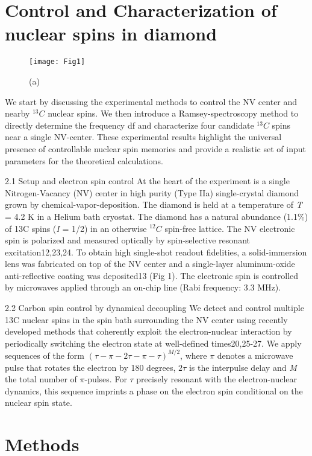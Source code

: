 \section{Control and Characterization of nuclear spins in diamond}
\begin{figure*}
	\centering
	\texttt{[image: Fig1]}
	\caption{\label{fig:cdl-fig1} \textbf{} (a) }
\end{figure*}

We start by discussing the experimental methods to control the NV center and nearby $^{13}C$  nuclear spins. We then introduce a Ramsey-spectroscopy method to directly determine the frequency df and characterize four candidate $^{13}C$  spins near a single NV-center. These experimental results highlight the universal presence of controllable nuclear spin memories and provide a realistic set of input parameters for the theoretical calculations.

2.1 Setup and electron spin control
At the heart of the experiment is a single Nitrogen-Vacancy (NV) center in high purity (Type IIa) single-crystal diamond grown by chemical-vapor-deposition. The diamond is held at a temperature of \textit{T} = 4.2 K in a Helium bath cryostat. The diamond has a natural abundance (1.1\%) of 13C spins (\textit{I} = 1/2) in an otherwise $^{12}C$ spin-free lattice. The NV electronic spin is polarized and measured optically by spin-selective resonant excitation12,23,24. To obtain high single-shot readout fidelities, a solid-immersion lens was fabricated on top of the NV center and a single-layer aluminum-oxide anti-reflective coating was deposited13 (Fig 1). The electronic spin is controlled by microwaves applied through an on-chip line (Rabi frequency: 3.3 MHz).     

2.2 Carbon spin control by dynamical decoupling
We detect and control multiple 13C nuclear spins in the spin bath surrounding the NV center using recently developed methods that coherently exploit the electron-nuclear interaction by periodically switching the electron state at well-defined times20,25-27. We apply sequences of the form $(\tau - \pi - 2\tau - \pi - \tau)^{M/2}$, where $\pi$ denotes a microwave pulse that rotates the electron by 180 degrees, $2\tau$ is the interpulse delay and \textit{M} the total number of $\pi$-pulses. For $\tau$ precisely resonant with the electron-nuclear dynamics, this sequence imprints a phase on the electron spin conditional on the nuclear spin state. 


\section{Methods}



\newpage




